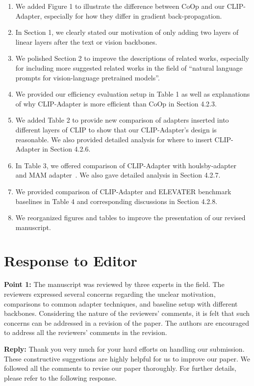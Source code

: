 \documentclass[default]{sn-jnl}%
\theoremstyle{thmstyleone}%
\theoremstyle{thmstyletwo}%
\theoremstyle{thmstylethree}%
\begin{document}
\begin{enumerate}
    \item We added Figure 1 to illustrate the difference between CoOp and our CLIP-Adapter, especially for how they differ in gradient back-propagation.
    \item In Section 1, we clearly stated our motivation of only adding two layers of linear layers after the text or vision backbones.
    \item We polished Section 2 to improve the descriptions of related works, especially for including more suggested related works in the field of ``natural
language prompts for vision-language pretrained models''.
    \item We provided our efficiency evaluation setup in Table 1 as well as explanations of why CLIP-Adapter is more efficient than CoOp in Section 4.2.3.
    \item We added Table 2 to provide new comparison of adapters inserted into different layers of CLIP to show that our CLIP-Adapter's design is reasonable. We also provided detailed analysis for where to insert CLIP-Adapter in Section 4.2.6.
    \item In Table 3, we offered comparison of CLIP-Adapter with houlsby-adapter~\cite{houlsby2019parameter} and MAM adapter~\cite{he2022towards}. We also gave detailed analysis in Section 4.2.7.
    \item We provided comparison of CLIP-Adapter and ELEVATER
benchmark baselines in Table 4 and corresponding discussions in Section 4.2.8.
    \item We reorganized figures and tables to improve the presentation of our revised manuscript.
\end{enumerate}


\section{Response to Editor}
\label{sec:editor}

\textbf{Point 1:} The manuscript was reviewed by three experts in the field. The reviewers expressed several concerns regarding the unclear motivation, comparisons to common adapter techniques, and baseline setup with different backbones. Considering the nature of the reviewers' comments, it is felt that such concerns can be addressed in a revision of the paper. The authors are encouraged to address all the reviewers' comments in the revision.

\noindent \textbf{Reply:} Thank you very much for your hard efforts on handling our submission. These constructive suggestions are highly helpful for us to improve our paper. We followed all the comments to revise our paper thoroughly. For further details, please refer to the following response.
\end{document}
